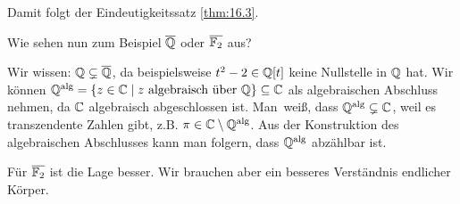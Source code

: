\documentclass[12pt,a4paper]{scrartcl}
\begin{document}
Damit folgt der Eindeutigkeitssatz \ref{thm:16.3}.

\medskip

Wie sehen nun zum Beispiel $\overline{\mathbb Q}$ oder $\overline{\mathbb F_2}$ aus?
\begin{bem}
	Wir wissen: $\mathbb Q\subsetneq \overline{\mathbb Q}$, da beispielsweise $t^2-2\in \mathbb Q[t]$ keine Nullstelle in $\mathbb Q$ hat. Wir können $\mathbb Q^{\text{alg}} = \{z\in \mathbb C\mid \text{$z$ algebraisch über $\mathbb Q$}\}\subseteq \mathbb C$ als algebraischen Abschluss nehmen, da $\mathbb C$ algebraisch abgeschlossen ist. \glqq Man\grqq\ weiß, dass $\mathbb Q^{\text{alg}} \subsetneq \mathbb C$, weil es transzendente Zahlen gibt, z.B. $\pi\in\mathbb C\setminus\mathbb Q^{\text{alg}}$.
	Aus der Konstruktion des algebraischen Abschlusses kann man folgern, dass $\mathbb Q^{\text{alg}}$ abzählbar ist.
	
	Für $\overline{\mathbb F_2}$ ist die Lage besser. Wir brauchen aber ein besseres Verständnis endlicher Körper.
\end{bem}
\end{document}
